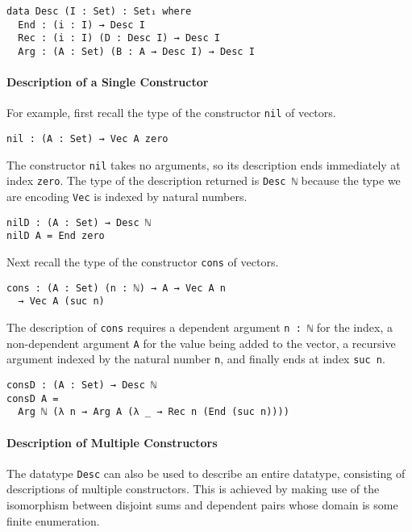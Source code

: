 \documentclass[nonatbib]{sigplanconf}
\begin{document}
\begin{verbatim}
data Desc (I : Set) : Set₁ where
  End : (i : I) → Desc I
  Rec : (i : I) (D : Desc I) → Desc I
  Arg : (A : Set) (B : A → Desc I) → Desc I
\end{verbatim}

\paragraph{Description of a Single Constructor}

For example, first recall the type of the
constructor {\tt nil} of vectors.

\begin{verbatim}
nil : (A : Set) → Vec A zero
\end{verbatim}

The constructor {\tt nil} takes no arguments, so its description
ends immediately at index {\tt zero}. The type of the description
returned is {\tt Desc ℕ} because the type we are encoding {\tt Vec}
is indexed by natural numbers.

\begin{verbatim}
nilD : (A : Set) → Desc ℕ
nilD A = End zero
\end{verbatim}

Next recall the type of the
constructor {\tt cons} of vectors.

\begin{verbatim}
cons : (A : Set) (n : ℕ) → A → Vec A n
  → Vec A (suc n)
\end{verbatim}

The description of {\tt cons} requires a dependent argument
{\tt n : ℕ} for the index, a non-dependent argument {\tt A} for the value
being added to the vector, a recursive argument indexed by the
natural number {\tt n}, and finally ends at index {\tt suc n}.

\begin{verbatim}
consD : (A : Set) → Desc ℕ
consD A =
  Arg ℕ (λ n → Arg A (λ _ → Rec n (End (suc n))))
\end{verbatim}

\paragraph{Description of Multiple Constructors}
\label{sec:background:multiple}

The datatype {\tt Desc} can also be used to describe an entire
datatype, consisting of descriptions of multiple constructors.
This is achieved by making use of the isomorphism between disjoint
sums and dependent pairs whose domain is some finite enumeration.
\end{document}
